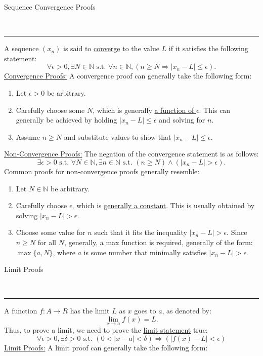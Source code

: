 \documentclass{article}
\newcommand{\suchthat}{\textrm{ s.t. }}
\newcommand{\header}[1]{\begin{large}\noindent #1\end{large}\\\rule{\textwidth}{0.5pt}}
\newcommand{\sheader}[1]{\underline{#1:}}
\begin{document}
\header{Sequence Convergence Proofs}
A sequence $(x_n)$ is said to \underline{converge} to the value $L$ if it satisfies
the following statement:
\[
    \forall \epsilon > 0, \exists N \in \mathbb{N} \suchthat \forall n \in \mathbb{N}, \left(n \geq N \Rightarrow |x_n - L| \leq \epsilon\right).    
\]
\sheader{Convergence Proofs} A convergence proof can generally take the following form:
\begin{enumerate}
    \item Let $\epsilon > 0$ be arbitrary.
    \item Carefully choose some $N$, which is generally \underline{a function of $\epsilon$}. This
    can generally be achieved by holding $|x_n - L| \leq \epsilon$ and solving for $n$.
    \item Assume $n \geq N$ and substitute values to show that $|x_n - L| \leq \epsilon$.
\end{enumerate}
\sheader{Non-Convergence Proofs} The negation of the convergence statement is as follows:
\[
    \exists \epsilon > 0 \suchthat \forall N \in \mathbb{N} , \exists n \in \mathbb{N} \suchthat (n \geq N) \wedge (|x_n -L| > \epsilon).
\]
Common proofs for non-convergence proofs generally resemble:
\begin{enumerate}
    \item Let $N \in \mathbb{N}$ be arbitrary.
    \item Carefully choose $\epsilon$, which is \underline{generally a constant}.
    This is usually obtained by solving $|x_n - L| > \epsilon$.
    \item Choose some value for $n$ such that it fits the inequality $|x_n -L| >\epsilon$.
    Since $n \geq N$ for all $N$, generally, a max function is required, generally of the form:
    $\max\{a, N\}$, where $a$ is some number that minimally satisfies $|x_n - L| > \epsilon$.
\end{enumerate}
\pagebreak
\header{Limit Proofs}
A function $f:A \to R$ has the limit $L$ as $x$ goes to $a$, as denoted by:
\[
    \lim_{x\to a}f(x) = L.    
\]
Thus, to prove a limit, we need to prove the \underline{limit statement} true:
\[
    \forall \epsilon > 0, \exists \delta > 0 \suchthat (0 < |x - a| < \delta) \Rightarrow (|f(x) - L| < \epsilon)    
\]
\sheader{Limit Proofs} A limit proof can generally take the following form:
\end{document}
